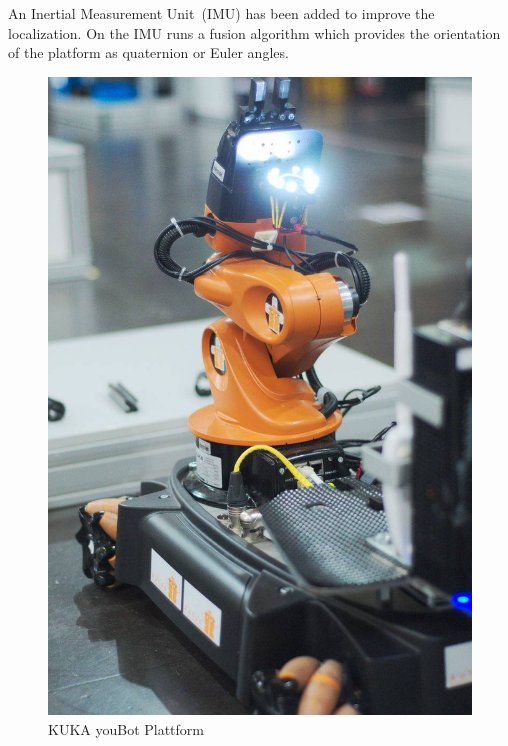 An Inertial Measurement Unit~(IMU) has been added to improve the localization. 
On the IMU runs a fusion algorithm which provides the orientation of the platform as quaternion or Euler angles.


\begin{figure}[htbp]
	\begin{minipage}{0.45\textwidth}
		\includegraphics[width=\textwidth]{img/YoubotInAction.jpg}
		\caption{KUKA youBot Plattform}

\end{minipage}
\end{figure}
